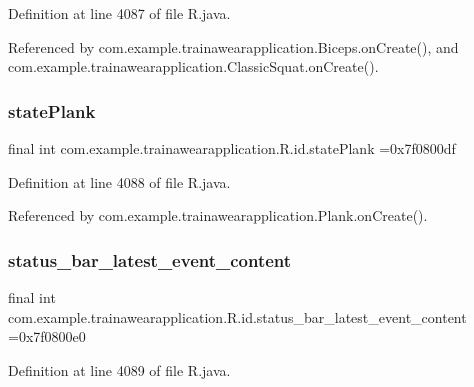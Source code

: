 Definition at line 4087 of file R.\+java.



Referenced by com.\+example.\+trainawearapplication.\+Biceps.\+on\+Create(), and com.\+example.\+trainawearapplication.\+Classic\+Squat.\+on\+Create().

\mbox{\label{classcom_1_1example_1_1trainawearapplication_1_1_r_1_1id_a681c523be53529954b3eaec9b1a551ef}} 
\subsubsection{\texorpdfstring{statePlank}{statePlank}}
{\footnotesize\ttfamily final int com.\+example.\+trainawearapplication.\+R.\+id.\+state\+Plank =0x7f0800df\hspace{0.3cm}{\ttfamily [static]}}



Definition at line 4088 of file R.\+java.



Referenced by com.\+example.\+trainawearapplication.\+Plank.\+on\+Create().

\mbox{\label{classcom_1_1example_1_1trainawearapplication_1_1_r_1_1id_a918e3cd6364040312d0e03185c6c5ec3}} 
\subsubsection{\texorpdfstring{status\_bar\_latest\_event\_content}{status\_bar\_latest\_event\_content}}
{\footnotesize\ttfamily final int com.\+example.\+trainawearapplication.\+R.\+id.\+status\+\_\+bar\+\_\+latest\+\_\+event\+\_\+content =0x7f0800e0\hspace{0.3cm}{\ttfamily [static]}}



Definition at line 4089 of file R.\+java.

